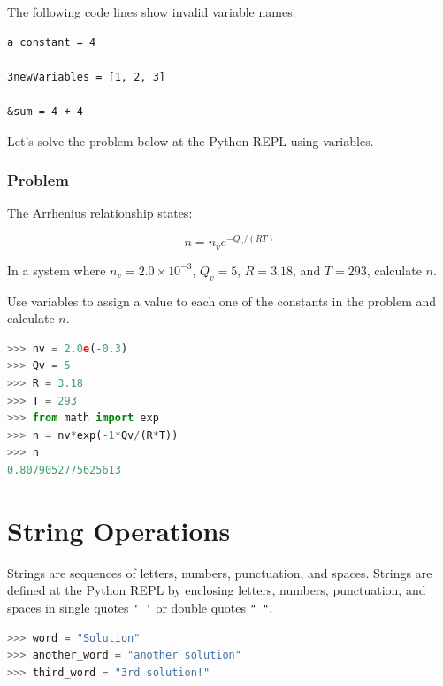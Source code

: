 \documentclass{book}
\begin{document}
    
        The following code lines show invalid variable names:
    




    
        \begin{lstlisting}
a constant = 4

3newVariables = [1, 2, 3]

&sum = 4 + 4
\end{lstlisting}
    




    
        Let's solve the problem below at the Python REPL using variables.

\subsubsection{Problem}\label{problem}

The Arrhenius relationship states:

\[ n = n_{v}e^{-Q_v/(RT)} \]

In a system where \(n_v = 2.0 \times 10^{-3}\), \(Q_v = 5\), \(R=3.18\),
and \(T=293\), calculate \(n\).

Use variables to assign a value to each one of the constants in the
problem and calculate \(n\).

\begin{lstlisting}[language=Python]
>>> nv = 2.0e(-0.3)
>>> Qv = 5
>>> R = 3.18
>>> T = 293
>>> from math import exp
>>> n = nv*exp(-1*Qv/(R*T))
>>> n
0.8079052775625613
\end{lstlisting}
    




    
        \section{String Operations}\label{string-operations}
    




    
        Strings are sequences of letters, numbers, punctuation, and spaces.
Strings are defined at the Python REPL by enclosing letters, numbers,
punctuation, and spaces in single quotes \lstinline!' '! or double
quotes \lstinline!" "!.

\begin{lstlisting}[language=Python]
>>> word = "Solution"
>>> another_word = "another solution"
>>> third_word = "3rd solution!"
\end{lstlisting}
\end{document}
